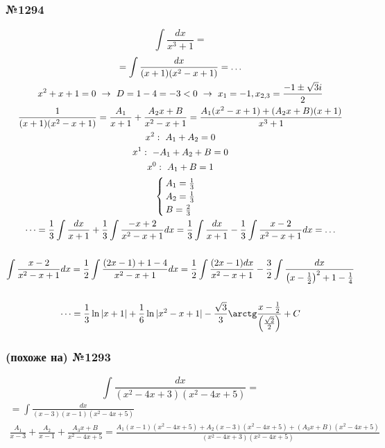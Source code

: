\documentclass{article}
\begin{document}
\subsubsection{№1294}
\[
    \int \frac{dx}{x^3 + 1} =
\]
\begin{gather*}
    = \int \frac{dx}{(x + 1)(x^2 - x + 1)} = \dots \\
    x^2 + x + 1 = 0 ~\rightarrow~ D = 1 - 4 = -3 < 0 ~\rightarrow~ x_1 = -1, x_{2, 3} = \frac{-1 \pm \sqrt{3}i}{2} \\
    \frac{1}{(x + 1)(x^2 - x + 1)} = \frac{A_1}{x + 1} + \frac{A_2x + B}{x^2 - x + 1} =
    \frac{A_1(x^2 - x + 1) + (A_2x + B)(x + 1)}{x^3 + 1} \\
    x^2:~  A_1 + A_2     = 0 \\
    x^1:~ -A_1 + A_2 + B = 0 \\
    x^0:~  A_1       + B = 1 \\
    \begin{cases}
        A_1 = \frac{1}{3} \\
        A_2 = \frac{1}{3} \\
        B   = \frac{2}{3}
    \end{cases} \\
    \dots = \frac{1}{3} \int \frac{dx}{x + 1} + \frac{1}{3} \int \frac{-x + 2}{x^2 - x + 1}dx =
    \frac{1}{3} \int \frac{dx}{x + 1} - \frac{1}{3} \int \frac{x - 2}{x^2 - x + 1}dx = \dots \\ \\
    \int \frac{x - 2}{x^2 - x + 1}dx = \frac{1}{2} \int \frac{(2x - 1) + 1 - 4}{x^2 - x + 1}dx = 
    \frac{1}{2} \int \frac{(2x - 1)dx}{x^2 - x + 1} - \frac{3}{2} \int \frac{dx}{\left( x - \frac{1}{2} \right)^2 + 1 - \frac{1}{4}} \\ \\
    \dots = \frac{1}{3} \ln |x + 1| + \frac{1}{6} \ln |x^2 - x + 1| - \frac{\sqrt{3}}{3} \arctg \frac{x - \frac{1}{2}}{\left(\frac{\sqrt{2}}{2}\right)} + C
\end{gather*}

\subsubsection{(похоже на) №1293}
\[
    \int \frac{dx}{(x^2 - 4x + 3)(x^2 - 4x + 5)} = 
\]
\begin{gather*}
    = \int \frac{dx}{(x - 3)(x - 1)(x^2 - 4x + 5)} \\
    \frac{A_1}{x - 3} + \frac{A_2}{x - 1} + \frac{A_3x + B}{x^2 - 4x + 5} =
    \frac{A_1(x - 1)(x^2 - 4x + 5) + A_2(x - 3)(x^2 - 4x + 5) + (A_3x + B)(x^2 - 4x + 5)}{(x^2 - 4x + 3)(x^2 - 4x + 5)}
\end{gather*}
\end{document}
